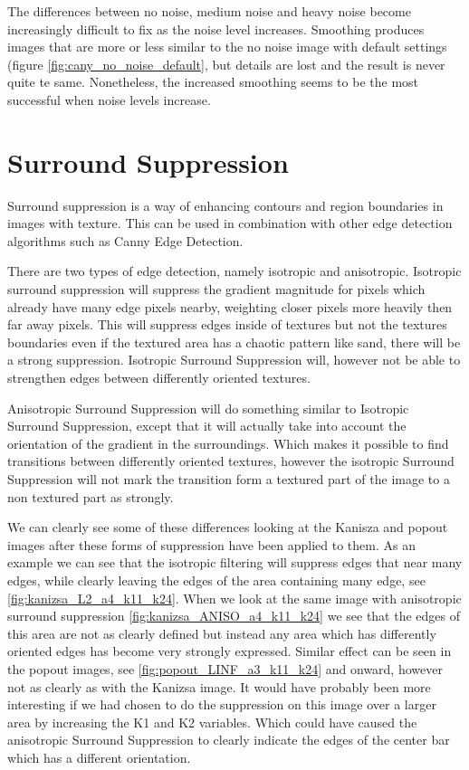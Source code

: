 \documentclass[10pt,a4paper]{article}
\begin{document}
The differences between no noise, medium noise and heavy noise become increasingly difficult to fix as the noise level increases. Smoothing produces images that are more or less similar to the no noise image with default settings (figure \ref{fig:cany_no_noise_default}, but details are lost and the result is never quite te same. Nonetheless, the increased smoothing seems to be the most successful when noise levels increase. 

\section{Surround Suppression}
Surround suppression is a way of enhancing contours and region boundaries in images with texture. This can be used in combination with other edge detection algorithms such as Canny Edge Detection. 

There are two types of edge detection, namely isotropic and anisotropic. Isotropic surround suppression will suppress the gradient magnitude for pixels which already have many edge pixels nearby, weighting closer pixels more heavily then far away pixels. This will suppress edges inside of textures but not the textures boundaries even if the textured area has a chaotic pattern like sand, there will be a strong suppression. Isotropic Surround Suppression will, however not be able to strengthen edges between differently oriented textures.

Anisotropic Surround Suppression will do something similar to Isotropic Surround Suppression, except that it will actually take into account the orientation of the gradient in the surroundings. Which makes it possible to find transitions between differently oriented textures, however the isotropic Surround Suppression will not mark the transition form a textured part of the image to a non textured part as strongly.

We can clearly see some of these differences looking at the Kanisza and popout images after these forms of suppression have been applied to them. As an example we can see that the isotropic filtering will suppress edges that near many edges, while clearly leaving the edges of the area containing many edge, see \ref{fig:kanizsa_L2_a4_k11_k24}. When we look at the same image with anisotropic surround suppression \ref{fig:kanizsa_ANISO_a4_k11_k24} we see that the edges of this area are not as clearly defined but instead any area which has differently oriented edges has become very strongly expressed. Similar effect can be seen in the popout images, see \ref{fig:popout_LINF_a3_k11_k24} and onward, however not as clearly as with the Kanizsa image. It would have probably been more interesting if we had chosen to do the suppression on this image over a larger area by increasing the K1 and K2 variables. Which could have caused the anisotropic Surround Suppression to clearly indicate the edges of the center bar which has a different orientation.
\end{document}
